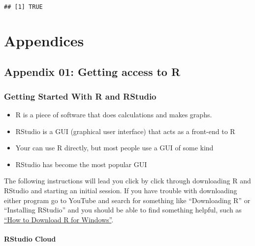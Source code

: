 \documentclass[
]{book}
\providecommand{\tightlist}{%
  \setlength{\itemsep}{0pt}\setlength{\parskip}{0pt}}
\begin{document}
\begin{lstlisting}
## [1] TRUE
\end{lstlisting}

\hypertarget{part-appendices}{%
\part{Appendices}\label{part-appendices}}

\hypertarget{section}{%
\subsection*{}\label{section}}

\hypertarget{appendix-01-getting-access-to-r}{%
\chapter*{Appendix 01: Getting access to R}\label{appendix-01-getting-access-to-r}}

\hypertarget{getting-started-with-r-and-rstudio}{%
\section{Getting Started With R and RStudio}\label{getting-started-with-r-and-rstudio}}

\begin{itemize}
\tightlist
\item
  R is a piece of software that does calculations and makes graphs.
\item
  RStudio is a GUI (graphical user interface) that acts as a front-end to R
\item
  Your can use R directly, but most people use a GUI of some kind
\item
  RStudio has become the most popular GUI
\end{itemize}

The following instructions will lead you click by click through downloading R and RStudio and starting an initial session. If you have trouble with downloading either program go to YouTube and search for something like ``Downloading R'' or ``Installing RStudio'' and you should be able to find something helpful, such as \href{https://www.youtube.com/watch?v=GYdmkLgV9n8}{``How to Download R for Windows''}.

\hypertarget{rstudio-cloud}{%
\subsection{RStudio Cloud}\label{rstudio-cloud}}
\end{document}
